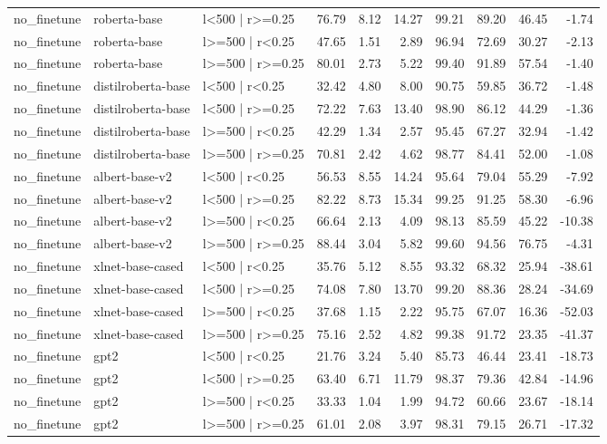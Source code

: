 \begin{tabular}{lllrrrrrrr}
no_finetune & roberta-base & l<500 | r>=0.25 & 76.79 & 8.12 & 14.27 & 99.21 & 89.20 & 46.45 & -1.74 \\
no_finetune & roberta-base & l>=500 | r<0.25 & 47.65 & 1.51 & 2.89 & 96.94 & 72.69 & 30.27 & -2.13 \\
no_finetune & roberta-base & l>=500 | r>=0.25 & 80.01 & 2.73 & 5.22 & 99.40 & 91.89 & 57.54 & -1.40 \\
no_finetune & distilroberta-base & l<500 | r<0.25 & 32.42 & 4.80 & 8.00 & 90.75 & 59.85 & 36.72 & -1.48 \\
no_finetune & distilroberta-base & l<500 | r>=0.25 & 72.22 & 7.63 & 13.40 & 98.90 & 86.12 & 44.29 & -1.36 \\
no_finetune & distilroberta-base & l>=500 | r<0.25 & 42.29 & 1.34 & 2.57 & 95.45 & 67.27 & 32.94 & -1.42 \\
no_finetune & distilroberta-base & l>=500 | r>=0.25 & 70.81 & 2.42 & 4.62 & 98.77 & 84.41 & 52.00 & -1.08 \\
no_finetune & albert-base-v2 & l<500 | r<0.25 & 56.53 & 8.55 & 14.24 & 95.64 & 79.04 & 55.29 & -7.92 \\
no_finetune & albert-base-v2 & l<500 | r>=0.25 & 82.22 & 8.73 & 15.34 & 99.25 & 91.25 & 58.30 & -6.96 \\
no_finetune & albert-base-v2 & l>=500 | r<0.25 & 66.64 & 2.13 & 4.09 & 98.13 & 85.59 & 45.22 & -10.38 \\
no_finetune & albert-base-v2 & l>=500 | r>=0.25 & 88.44 & 3.04 & 5.82 & 99.60 & 94.56 & 76.75 & -4.31 \\
no_finetune & xlnet-base-cased & l<500 | r<0.25 & 35.76 & 5.12 & 8.55 & 93.32 & 68.32 & 25.94 & -38.61 \\
no_finetune & xlnet-base-cased & l<500 | r>=0.25 & 74.08 & 7.80 & 13.70 & 99.20 & 88.36 & 28.24 & -34.69 \\
no_finetune & xlnet-base-cased & l>=500 | r<0.25 & 37.68 & 1.15 & 2.22 & 95.75 & 67.07 & 16.36 & -52.03 \\
no_finetune & xlnet-base-cased & l>=500 | r>=0.25 & 75.16 & 2.52 & 4.82 & 99.38 & 91.72 & 23.35 & -41.37 \\
no_finetune & gpt2 & l<500 | r<0.25 & 21.76 & 3.24 & 5.40 & 85.73 & 46.44 & 23.41 & -18.73 \\
no_finetune & gpt2 & l<500 | r>=0.25 & 63.40 & 6.71 & 11.79 & 98.37 & 79.36 & 42.84 & -14.96 \\
no_finetune & gpt2 & l>=500 | r<0.25 & 33.33 & 1.04 & 1.99 & 94.72 & 60.66 & 23.67 & -18.14 \\
no_finetune & gpt2 & l>=500 | r>=0.25 & 61.01 & 2.08 & 3.97 & 98.31 & 79.15 & 26.71 & -17.32 \\

\end{tabular}

